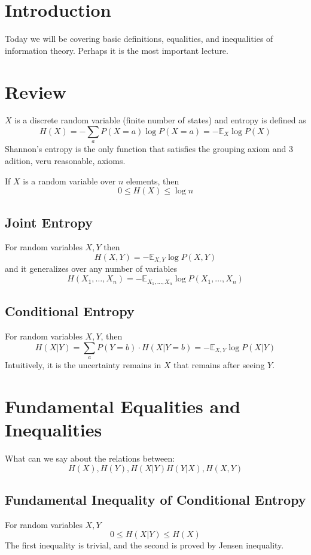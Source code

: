 \documentclass{article}
\begin{document}
\section{Introduction}

Today we will be covering basic definitions, equalities, and inequalities of information theory. Perhaps it is the most important lecture.

\section{Review}

$X$ is a discrete random variable (finite number of states) and entropy is defined as 
\[
H(X) = -\sum_a P(X=a)\log P(X=a)=-\mathbb{E}_X \log P(X)
\]
Shannon's entropy is the only function that satisfies the grouping axiom and 3 adition, veru reasonable, axioms.

If $X$ is a random variable over $n$ elements, then 
\[
0\leq H(X)\leq \log n 
\]

\subsection{Joint Entropy}

For random variables $X,Y$ then 
\[
H(X,Y) = -\mathbb{E}_{X,Y} \log P(X,Y)
\]
and it generalizes over any number of variables
\[
H(X_1,\ldots,X_n) = -\mathbb{E}_{X_1,\ldots,X_n} \log P(X_1,\ldots,X_n)
\]

\subsection{Conditional Entropy}

For random variables $X,Y$, then 
\[
H(X|Y) = \sum_a P(Y=b)\cdot H(X|Y=b)=- \mathbb{E}_{X,Y} \log P(X|Y)
\]
Intuitively, it is the uncertainty remains in $X$ that remains after seeing $Y$.

\section{Fundamental Equalities and Inequalities}

What can we say about the relations between:
\[
H(X),H(Y),H(X|Y)H(Y|X),H(X,Y)
\]
\subsection{Fundamental Inequality of Conditional Entropy}

For random variables $X,Y$
\[
0\leq H(X|Y)\leq H(X)
\]
The first inequality is trivial, and the second is proved by Jensen inequality.
\end{document}
